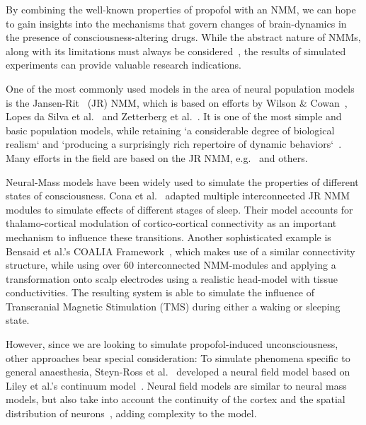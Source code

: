 
By combining the well-known properties of propofol with an NMM, we can hope to gain insights into the mechanisms that
govern changes of brain-dynamics in the presence of consciousness-altering drugs.
While the abstract nature of NMMs, along with its limitations must always be
considered~\cite{deschle_validity_2021},
the results of simulated experiments can provide valuable research indications.

One of the most commonly used models in the area of neural population models is the
Jansen-Rit~\cite{jansen_electroencephalogram_1995} (JR) NMM,
which is based on efforts by Wilson \& Cowan~\cite{wilson_excitatory_1972},
Lopes da Silva et al.~\cite{lopes_da_silva_model_1974, lopes_da_silva_models_1976} and
Zetterberg et al.~\cite{zetterberg_performance_1978}.
It is one of the most simple and basic population models,
while retaining `a considerable degree of biological realism` and
`producing a surprisingly rich repertoire of dynamic behaviors`~\cite{knösche_jansen-rit_2014}.
Many efforts in the field are based on the JR NMM, e.g.~\cite{wendling_relevance_2000, david_neural_2003,
    moran_dynamic_2009, spiegler_bifurcation_2010, cona_thalamo-cortical_2014, bensaid_coalia_2019} and others.



Neural-Mass models have been widely used to simulate the properties  of different states of
consciousness.
Cona et al.~\cite{cona_thalamo-cortical_2014} adapted multiple interconnected JR NMM modules to simulate effects
of different stages of sleep.
Their model accounts for thalamo-cortical modulation of cortico-cortical connectivity as an important mechanism to
influence these transitions.
Another sophisticated example is Bensaid et al.'s COALIA Framework~\cite{wendling_epileptic_2002, bensaid_coalia_2019},
which makes use of a similar connectivity structure, while using over 60 interconnected NMM-modules and applying a
transformation onto scalp electrodes using a realistic head-model with tissue conductivities.
The resulting system is able to simulate the influence of Transcranial Magnetic Stimulation (TMS) during either
a waking or sleeping state.

However, since we are looking to simulate propofol-induced unconsciousness, other approaches bear special
consideration:
To simulate phenomena specific to general anaesthesia,
Steyn-Ross et al.~\cite{steyn_ross_modelling_2004, hutt_progress_2011} developed a neural field model based
on Liley et al.'s continuum model~\cite{liley_continuum_1999}.
Neural field models are similar to neural mass models,
but also take into account the continuity of the cortex and the spatial distribution of
neurons~\cite{glomb_computational_2022}, adding complexity to the model.


